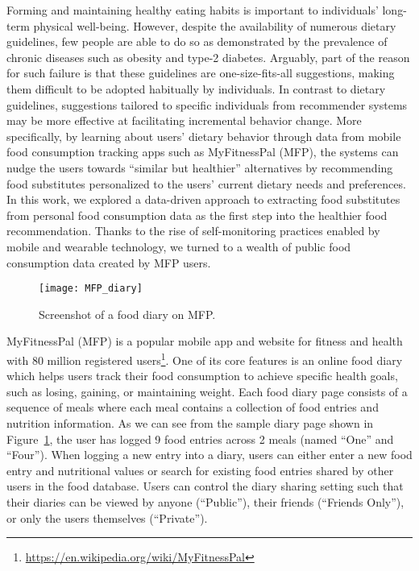 Forming and maintaining healthy eating habits is important to individuals' long-term physical well-being. However, despite the availability of numerous dietary guidelines, few people are able to do so as demonstrated by the prevalence of chronic diseases such as obesity and type-2 diabetes. Arguably, part of the reason for such failure is that these guidelines are one-size-fits-all suggestions, making them difficult to be adopted habitually by individuals. In contrast to dietary guidelines, suggestions tailored to specific individuals from recommender systems may be more effective at facilitating incremental behavior change. More specifically, by learning about users' dietary behavior through data from mobile food consumption tracking apps such as MyFitnessPal (MFP), the systems can nudge the users towards ``similar but healthier'' alternatives by recommending food substitutes personalized to the users' current dietary needs and preferences. In this work, we explored a data-driven approach to extracting food substitutes from personal food consumption data as the first step into the healthier food recommendation. Thanks to the rise of self-monitoring practices enabled by mobile and wearable technology, we turned to a wealth of public food consumption data created by MFP users. 


\begin{figure}[t]
\centering
\texttt{[image: MFP\_diary]}
\caption{Screenshot of a food diary on MFP.}
\label{fig:mfp_screenshot}
\end{figure}


MyFitnessPal (MFP) is a popular mobile app and website for fitness and health with 80 million registered users\footnote{\url{https://en.wikipedia.org/wiki/MyFitnessPal}}. One of its core features is an online food diary which helps users track their food consumption to achieve specific health goals, such as losing, gaining, or maintaining weight. Each food diary page consists of a sequence of meals where each meal contains a collection of food entries and nutrition information. As we can see from the sample diary page shown in Figure~\ref{fig:mfp_screenshot}, the user has logged 9 food entries across 2 meals (named ``One'' and ``Four''). When logging a new entry into a diary, users can either enter a new food entry and nutritional values or search for existing food entries shared by other users in the food database. Users can control the  diary sharing setting such that their diaries can be viewed by anyone (``Public''), their friends (``Friends Only''), or only the users themselves (``Private'').

